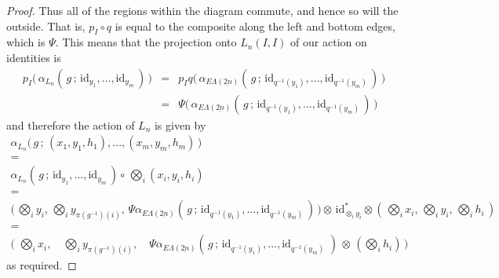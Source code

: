 \documentclass{amsbook} %
\newcommand{\ELnn}{E\Lambda(\underline{2n})}
\numberwithin{section}{chapter}
\begin{document}
\begin{proof}
Thus all of the regions within the diagram commute, and hence so will the outside. That is, $p_I \circ q$ is equal to the composite along the left and bottom edges, which is $\Psi$. This means that the projection onto $L_n(I,I)$ of our action on identities is
\[ \begin{array}{rll}
			p_I \big( \, \alpha_{L_n}( \, g \, ; \, \mathrm{id}_{y_1}, ..., \mathrm{id}_{y_m} \, ) \, \big) & = &  p_I q\big( \, \alpha_{\ELnn}( \, g \, ; \, \mathrm{id}_{q^{-1}(y_1)}, ..., \mathrm{id}_{q^{-1}(y_m)} \, ) \, \big) \\
			& = & \Psi \big( \, \alpha_{\ELnn}( \, g \, ; \, \mathrm{id}_{q^{-1}(y_1)}, ..., \mathrm{id}_{q^{-1}(y_m)} \, ) \, \big)
		\end{array}
\]
and therefore the action of $L_n$ is given by
\[ \begin{array}{c}
			\alpha_{L_n}\big( \, g \, ; \, (x_1, y_1, h_1), ..., (x_m, y_m, h_m) \, \big) \\
			= \\
			\alpha_{L_n}( \, g \, ; \, \mathrm{id}_{y_1}, ..., \mathrm{id}_{y_m} \, ) \circ \, \bigotimes_i (x_i, y_i, h_i) \\
			= \\
			\big( \, \bigotimes_i y_i, \, \bigotimes_i y_{\pi(g^{-1})(i)}, \, \Psi \alpha_{\ELnn}( \, g \, ; \, \mathrm{id}_{q^{-1}(y_1)}, ..., \mathrm{id}_{q^{-1}(y_m)} \, ) \, \big) \otimes \, \mathrm{id}_{\otimes_i y_i}^* \otimes ( \, \bigotimes_i x_i, \, \bigotimes_i y_i, \, \bigotimes_i h_i \, ) \\
			= \\
			\big( \, \, \bigotimes_i x_i, \quad \bigotimes_i y_{\pi(g^{-1})(i)}, \quad \Psi \alpha_{\ELnn}( \, g \, ; \, \mathrm{id}_{q^{-1}(y_1)}, ..., \mathrm{id}_{q^{-1}(y_m)} \, \, ) \, \otimes \, (\bigotimes_i h_i) \, \big) 
		\end{array}
\]
as required.
\end{proof}









\end{document}
